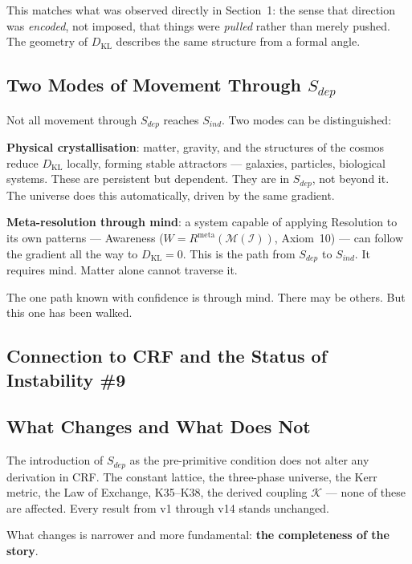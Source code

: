 \documentclass[12pt, a4paper]{article}
\begin{document}
This matches what was observed directly in Section~1: the sense that direction was
\textit{encoded}, not imposed, that things were \textit{pulled} rather than merely
pushed. The geometry of $D_{\mathrm{KL}}$ describes the same structure from a
formal angle.

\subsection{Two Modes of Movement Through $S_{dep}$}

Not all movement through $S_{dep}$ reaches $S_{ind}$. Two modes can be distinguished:

\textbf{Physical crystallisation}: matter, gravity, and the structures of the cosmos
reduce $D_{\mathrm{KL}}$ locally, forming stable attractors --- galaxies, particles,
biological systems. These are persistent but dependent. They are in $S_{dep}$, not
beyond it. The universe does this automatically, driven by the same gradient.

\textbf{Meta-resolution through mind}: a system capable of applying Resolution to
its own patterns --- Awareness ($W = R^{\mathrm{meta}}(\mathcal{M}(\mathcal{I}))$,
Axiom~10) --- can follow the gradient all the way to $D_{\mathrm{KL}} = 0$.
This is the path from $S_{dep}$ to $S_{ind}$. It requires mind. Matter alone
cannot traverse it.

The one path known with confidence is through mind. There may be others.
But this one has been walked.

\subsection*{Connection to CRF and the Status of Instability \#9}

\subsection{What Changes and What Does Not}

The introduction of $S_{dep}$ as the pre-primitive condition does not alter any
derivation in CRF. The constant lattice, the three-phase universe, the Kerr metric,
the Law of Exchange, K35--K38, the derived coupling $\mathcal{K}$ --- none of these
are affected. Every result from v1 through v14 stands unchanged.

What changes is narrower and more fundamental: \textbf{the completeness of the story}.
\end{document}
